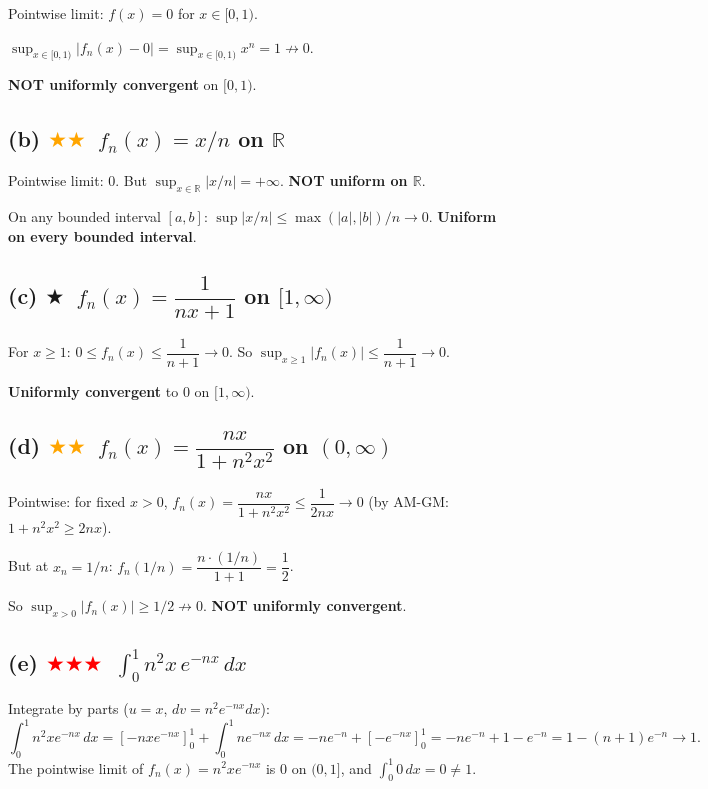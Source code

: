 \documentclass[12pt,a4paper]{article}
\newcommand{\easy}{\textcolor{green!60!black}{$\bigstar$}}
\newcommand{\medium}{\textcolor{orange}{$\bigstar\bigstar$}}
\newcommand{\hard}{\textcolor{red}{$\bigstar\bigstar\bigstar$}}
\begin{document}
Pointwise limit: $f(x)=0$ for $x\in[0,1)$.

$\sup_{x\in[0,1)}|f_n(x)-0|=\sup_{x\in[0,1)}x^n = 1\not\to 0$.

\textbf{NOT uniformly convergent} on $[0,1)$.

\subsection*{(b) \medium\ $f_n(x)=x/n$ on $\mathbb{R}$}

Pointwise limit: $0$.  But $\sup_{x\in\mathbb{R}}|x/n|=+\infty$.  \textbf{NOT uniform on $\mathbb{R}$}.

On any bounded interval $[a,b]$: $\sup|x/n|\leq \max(|a|,|b|)/n\to 0$.  \textbf{Uniform on every bounded interval}.

\subsection*{(c) \easy\ $f_n(x)=\dfrac{1}{nx+1}$ on $[1,\infty)$}

For $x\geq 1$: $0\leq f_n(x)\leq\dfrac{1}{n+1}\to 0$.  So $\sup_{x\geq 1}|f_n(x)|\leq\dfrac{1}{n+1}\to 0$.

\textbf{Uniformly convergent} to $0$ on $[1,\infty)$.

\subsection*{(d) \medium\ $f_n(x)=\dfrac{nx}{1+n^2x^2}$ on $(0,\infty)$}

Pointwise: for fixed $x>0$, $f_n(x)=\dfrac{nx}{1+n^2x^2}\leq\dfrac{1}{2nx}\to 0$ (by AM-GM: $1+n^2x^2\geq 2nx$).

But at $x_n=1/n$: $f_n(1/n)=\dfrac{n\cdot(1/n)}{1+1}=\dfrac{1}{2}$.

So $\sup_{x>0}|f_n(x)|\geq 1/2\not\to 0$.  \textbf{NOT uniformly convergent}.

\subsection*{(e) \hard\ $\displaystyle\int_0^1 n^2 x\,e^{-nx}\,dx$}

Integrate by parts ($u=x$, $dv=n^2e^{-nx}dx$):
\[
  \int_0^1 n^2 x e^{-nx}\,dx
  = \left[-nxe^{-nx}\right]_0^1 + \int_0^1 ne^{-nx}\,dx
  = -ne^{-n} + \left[-e^{-nx}\right]_0^1
  = -ne^{-n} + 1 - e^{-n}
  = 1-(n+1)e^{-n}\to 1.
\]
The pointwise limit of $f_n(x)=n^2xe^{-nx}$ is $0$ on $(0,1]$, and $\int_0^1 0\,dx=0\neq 1$.
\end{document}

